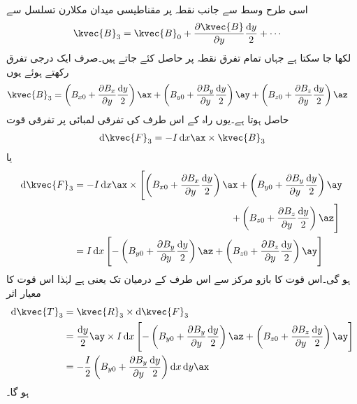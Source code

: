 اسی طرح وسط سے  جانب نقطہ  پر مقناطیسی میدان مکلارن تسلسل سے
\begin{align*}
\kvec{B}_3&=\kvec{B}_0 +\frac{\partial \kvec{B}}{\partial y}\frac{\dif y}{2}+\cdots
\end{align*}
لکھا جا سکتا ہے جہاں تمام تفرق نقطہ  پر حاصل کئے جاتے ہیں۔صرف ایک درجی تفرق رکھتے ہوئے یوں
\begin{align*}
\kvec{B}_3&=\left(B_{x0}+\frac{\partial B_{x}}{\partial y} \frac{\dif y}{2}\right)\ax+\left(B_{y0}+\frac{\partial B_{y}}{\partial y} \frac{\dif y}{2}\right)\ay+\left(B_{z0}+\frac{\partial B_{z}}{\partial y} \frac{\dif y}{2}\right)\az
\end{align*}
حاصل ہوتا ہے۔یوں راہ کے اس طرف کی  تفرقی لمبائی پر تفرقی قوت
\begin{align*}
\dif \kvec{F}_3=-I \dif x \ax \times \kvec{B}_3
\end{align*}
یا
\begin{align*}
\dif \kvec{F}_3&=-I \dif x \ax \times \left[\left(B_{x0}+\frac{\partial B_{x}}{\partial y} \frac{\dif y}{2}\right)\ax+\left(B_{y0}+\frac{\partial B_{y}}{\partial y} \frac{\dif y}{2}\right)\ay \right. \\
&\quad \quad \quad \quad\quad \quad \quad \quad\quad \quad \quad \quad\quad \quad \quad \quad \left.+\left(B_{z0}+\frac{\partial B_{z}}{\partial y} \frac{\dif y}{2}\right)\az\right]\\
&=I \dif x \left[-\left(B_{y0}+\frac{\partial B_{y}}{\partial y} \frac{\dif y}{2}\right)\az+\left(B_{z0}+\frac{\partial B_{z}}{\partial y} \frac{\dif y}{2}\right)\ay \right]
\end{align*}
ہو گی۔اس قوت کا بازو مرکز سے اس طرف کے درمیان تک  یعنی  ہے لہٰذا اس قوت کا معیار اثر
\begin{align*}
\dif \kvec{T}_3&=\kvec{R}_3 \times \dif \kvec{F}_3\\
&=\frac{\dif y}{2}\ay \times I \dif x \left[-\left(B_{y0}+\frac{\partial B_{y}}{\partial y} \frac{\dif y}{2}\right)\az+\left(B_{z0}+\frac{\partial B_{z}}{\partial y} \frac{\dif y}{2}\right)\ay \right]\\
&=-\frac{I}{2}\left(B_{y0}+\frac{\partial B_{y}}{\partial y} \frac{\dif y}{2}\right)\dif x \dif y\ax
\end{align*}
ہو گا۔ 

